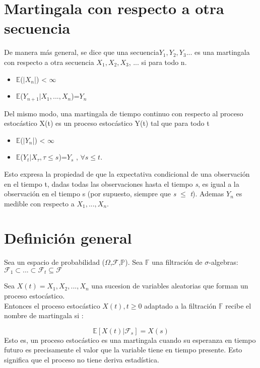 \documentclass[letterpaper, 10 pt, conference]{ieeeconf}  %
\begin{document}
\section{ Martingala con respecto a otra secuencia}
De manera más general, se dice que una secuencia$ Y_{1}, Y_{2}, Y_{3} $... es una martingala con respecto a otra secuencia  $X_{1}, X_{2}, X_{3}$, ... si para todo n.
\begin{itemize}
\item \(\mathbb{E}\)($|X_{n}$|) < $\infty$
\item \(\mathbb{E}\)($Y_{n+1}|X_{1},...,X_{n}$)=$Y_{n}$
\end{itemize}
Del mismo modo, una martingala de tiempo continuo con respecto al proceso estocástico X(t) es un proceso estocástico Y(t) tal que para todo t
\begin{itemize}
\item \(\mathbb{E}\)($|Y_{n}$|) < $\infty$
\item \(\mathbb{E}\)($Y_{t}|{X_{\tau},\tau \leq s} $)=$Y_{s}$ , $\forall s \leq t$.
\end{itemize}
Esto expresa la propiedad de que la expectativa condicional de una observación en el tiempo t, dadas todas las observaciones hasta el tiempo \textit{s}, es igual a la observación en el tiempo s (por supuesto, siempre que \textit{s} $\leq$ \textit{t}). Ademas $Y_{n}$ es medible con respecto a $X_{1},...,X_{n}$.

\section{Definición general}
Sea un espacio de probabilidad ($\Omega$,\(\mathcal{F}\),\(\mathbb{P}\)).
Sea \(\mathbb{F}\) una filtración de $\sigma$-algebras:
$
\mathcal{F}_{1}  \subset ...  \subset \mathcal{F}_{t}\subseteq \mathcal{F}$

Sea ${X(t)}=X_{1},X_{2},...,X_{n}$ una sucesion de variables aleatorias que forman un proceso estocástico.\\
Entonces el proceso estocástico ${X(t),t\geq0}$ adaptado a la filtración \(\mathbb{F}\) recibe el nombre de martingala si :

\begin{equation*}
\mathbb{E} [X(t)|\mathcal{F}_{s}] = X(s)
\end{equation*} Esto es, un proceso estocástico es una martingala cuando su esperanza en tiempo futuro es precisamente el valor que la variable tiene en tiempo presente. Esto significa que el proceso no tiene deriva estadística.
\end{document}

